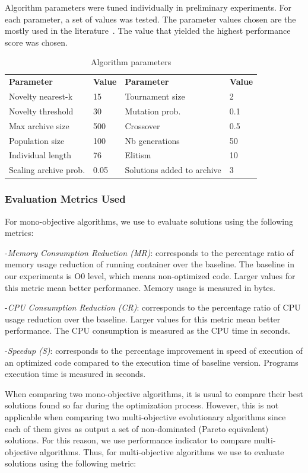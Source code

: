 Algorithm parameters were tuned individually in preliminary experiments. For each parameter, a set of values was tested. The parameter values chosen are the mostly used in the literature~\cite{lehman2008exploiting}. The value that yielded the highest performance score was chosen.  

\begin{table}
	\caption{Algorithm parameters}
	\begin{tabular}{| l |l| l |l| }\hline
		\textbf{Parameter} & \textbf{Value} & \textbf{Parameter} & \textbf{Value} \\	\hhline{|=|=|=|=|}	
		Novelty nearest-k  & 15 &  Tournament size & 2\\ 
		Novelty threshold & 30 &  Mutation prob. & 0.1\\  
		Max archive size & 500 &  Crossover & 0.5  \\  
		Population size & 100 &  Nb generations &  50 \\  
		Individual length & 76 & Elitism & 10  \\ 
		Scaling archive prob. & 0.05 & Solutions added to archive & 3  \\ 	\hline
	\end{tabular}
\end{table}

\subsubsection{Evaluation Metrics Used}

For mono-objective algorithms, we use to evaluate solutions using the following metrics:

-\textit{Memory Consumption Reduction (MR)}: corresponds to the percentage ratio of memory usage reduction of running container over the baseline. The baseline in our experiments is O0 level, which means non-optimized code. Larger values for this metric mean better performance. Memory usage is measured in bytes.

-\textit{CPU Consumption Reduction (CR)}: corresponds to the percentage ratio of CPU usage reduction over the baseline. Larger values for this metric mean better performance. The CPU consumption is measured as the CPU time in seconds.

-\textit{Speedup (S)}: corresponds to the percentage improvement in speed of execution of an optimized code compared to the execution time of baseline version. Programs execution time is measured in seconds.


When comparing two mono-objective algorithms, it is usual to compare their best solutions found so far during the optimization process. However, this is not applicable when comparing two multi-objective evolutionary algorithms since each of them gives as output a set of non-dominated (Pareto equivalent) solutions. For this reason, we use performance indicator to compare multi-objective algorithms.
Thus, for multi-objective algorithms we use to evaluate solutions using the following metric:

